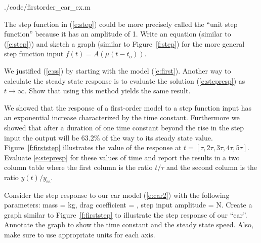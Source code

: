 
{./code/firstorder_car_ex.m}

\begin{ex}
The step function in (\ref{e:step}) could be more precisely called the ``unit step function'' because it has an amplitude of 1.  Write an equation (similar to (\ref{e:step})) and sketch a graph (similar to Figure~\ref{f:step}) for the more general step function input $f(t) = A(\mu(t-t_o))$.
\end{ex}

\begin{ex}
We justified (\ref{e:ss}) by starting with the model (\ref{e:first}).  Another way to calculate the steady state response is to evaluate the solution (\ref{e:stepresp}) as $t \to \infty$.  Show that using this method yields the same result.
\end{ex}

\begin{ex}
We showed that the response of a first-order model to a step function input has an exponential increase characterized by the time constant.  Furthermore we showed that after a duration of one time constant beyond the rise in the step input the output will be 63.2\% of the way to its steady state value.  Figure~\ref{f:firststep} illustrates the value of the response at  $t=[\tau,2\tau,3\tau,4\tau,5\tau]$.  Evaluate \ref{e:stepresp} for these values of time and report the results in a two column table where the first column is the ratio $t/\tau$ and the second column is the ratio $y(t)/y_{\mathrm{ss}}$.
\end{ex}

\begin{ex}
Consider the step response to our car model (\ref{e:car2}) with the following parameters: mass = \unit[750]{kg}, drag coefficient = , step input amplitude = \unit[10,000]{N}.  Create a graph similar to Figure~\ref{f:firststep} to illustrate the step response of our ``car''.  Annotate the graph to show the time constant and the steady state speed.  Also, make sure to use appropriate units for each axis.
\end{ex}

